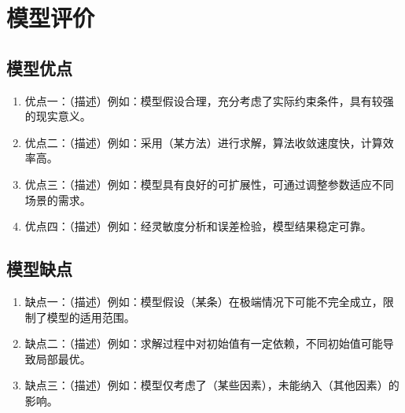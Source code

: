 \section{模型评价}

\subsection{模型优点}

\begin{enumerate}
    \item {\heiti 优点一：}（描述）例如：模型假设合理，充分考虑了实际约束条件，具有较强的现实意义。
    \item {\heiti 优点二：}（描述）例如：采用（某方法）进行求解，算法收敛速度快，计算效率高。
    \item {\heiti 优点三：}（描述）例如：模型具有良好的可扩展性，可通过调整参数适应不同场景的需求。
    \item {\heiti 优点四：}（描述）例如：经灵敏度分析和误差检验，模型结果稳定可靠。
\end{enumerate}

\subsection{模型缺点}

\begin{enumerate}
    \item {\heiti 缺点一：}（描述）例如：模型假设（某条）在极端情况下可能不完全成立，限制了模型的适用范围。
    \item {\heiti 缺点二：}（描述）例如：求解过程中对初始值有一定依赖，不同初始值可能导致局部最优。
    \item {\heiti 缺点三：}（描述）例如：模型仅考虑了（某些因素），未能纳入（其他因素）的影响。
\end{enumerate}
